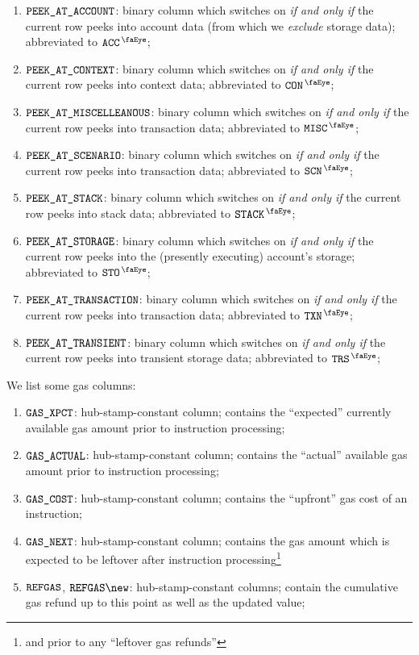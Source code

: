 \begin{enumerate}[resume]
	\item $\texttt{PEEK\_AT\_ACCOUNT}$:
		binary column which switches on \emph{if and only if} the current row peeks into account data (from which we \emph{exclude} storage data); 
		abbreviated to $\peekAccount$;
	\item $\texttt{PEEK\_AT\_CONTEXT}$:
		binary column which switches on \emph{if and only if} the current row peeks into context data; 
		abbreviated to $\peekContext$;
	\item $\texttt{PEEK\_AT\_MISCELLEANOUS}$:
		binary column which switches on \emph{if and only if} the current row peeks into transaction data; 
		abbreviated to $\peekMisc$;
	\item $\texttt{PEEK\_AT\_SCENARIO}$:
		binary column which switches on \emph{if and only if} the current row peeks into transaction data; 
		abbreviated to $\peekScenario$;
	\item $\texttt{PEEK\_AT\_STACK}$:
		binary column which switches on \emph{if and only if} the current row peeks into stack data; 
		abbreviated to $\peekStack$;
	\item $\texttt{PEEK\_AT\_STORAGE}$:
		binary column which switches on \emph{if and only if} the current row peeks into the (presently executing) account's storage; 
		abbreviated to $\peekStorage$;
	\item $\texttt{PEEK\_AT\_TRANSACTION}$:
		binary column which switches on \emph{if and only if} the current row peeks into transaction data; 
		abbreviated to $\peekTransaction$;
	\item $\texttt{PEEK\_AT\_TRANSIENT}$:
		binary column which switches on \emph{if and only if} the current row peeks into transient storage data;
		abbreviated to $\peekTransient$;
\end{enumerate}
\noindent We list some gas columns:
\begin{enumerate}[resume]
	\item $\texttt{GAS}\texttt{\_XPCT}$:
		hub-stamp-constant column; contains the ``expected'' currently available  gas amount prior to instruction processing;
	\item $\texttt{GAS}\texttt{\_ACTUAL}$:
		hub-stamp-constant column; contains the ``actual'' available  gas amount prior to instruction processing;
	\item $\texttt{GAS}\texttt{\_COST}$:
		hub-stamp-constant column; contains the ``upfront'' gas cost of an instruction;
	\item $\texttt{GAS}\texttt{\_NEXT}$:
		hub-stamp-constant column; contains the gas amount which is expected to be leftover after instruction processing\footnote{and prior to any ``leftover gas refunds''}
	\item $\texttt{REFGAS}$, $\refund\new$:
		hub-stamp-constant columns; contain the cumulative gas refund up to this point as well as the updated value;
\end{enumerate}
